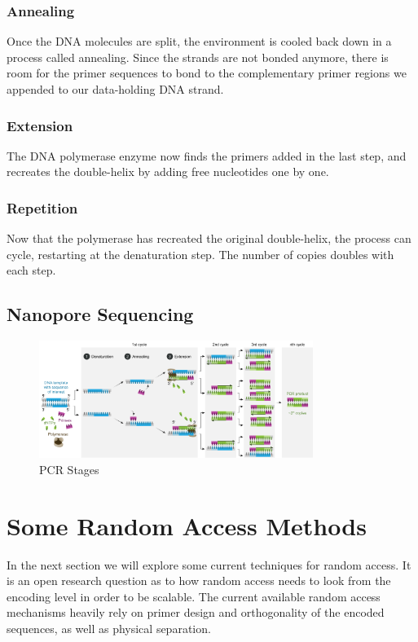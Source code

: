 \documentclass[a4paper,conference]{IEEEtran}
\begin{document}
\subsubsection{Annealing}
Once the DNA molecules are split, the environment is cooled back down in a process called annealing. Since the strands are not bonded anymore, there is room for the primer sequences to bond to the complementary primer regions we appended to our data-holding DNA strand.
\subsubsection{Extension}
The DNA polymerase enzyme now finds the primers added in the last step, and recreates the double-helix by adding free nucleotides one by one.
\subsubsection{Repetition}
Now that the polymerase has recreated the original double-helix, the process can cycle, restarting at the denaturation step. The number of copies doubles with each step.

\subsection{Nanopore Sequencing}


\begin{figure}[!t]
\centering
\includegraphics[width=3.5in]{pcr}
\caption{PCR Stages}
\label{fig_sim}
\end{figure}


\section{Some Random Access Methods}
In the next section we will explore some current techniques for random access. It is an open research question as to how random access needs to look from the encoding level in order to be scalable. The current available random access mechanisms heavily rely on primer design and orthogonality of the encoded sequences, as well as physical separation.
\end{document}
